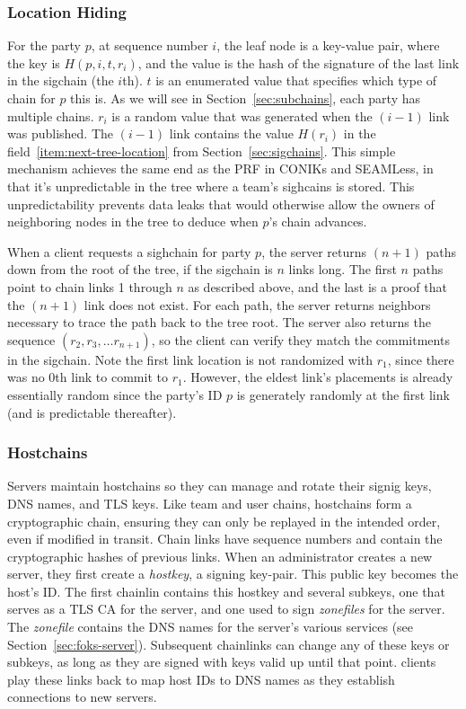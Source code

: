 \subsubsection{Location Hiding}
\label{sec:location-hiding}

For the party $p$, at sequence number $i$, the leaf node is a key-value pair,
where the key is $H(p,i,t,r_i)$, and the value is the hash of the signature of
the last link in the sigchain (the $i$th). $t$ is an enumerated value that
specifies which type of chain for $p$ this is. As we will see in 
Section~\ref{sec:subchains}, each party has multiple chains.  $r_i$ is a random
value that was generated when the $(i-1)$ link was published. The $(i-1)$ link
contains the value $H(r_i)$ in the field~\ref{item:next-tree-location} from
Section~\ref{sec:sigchains}. This simple mechanism achieves the same end as the
PRF in CONIKs and SEAMLess, in that it's unpredictable in the tree where a
team's sighcains is stored. This unpredictability prevents data leaks that would
otherwise allow the owners of neighboring nodes in the tree to deduce when $p$'s
chain advances. 

When a client requests a sighchain for party $p$, the server returns $(n+1)$
paths down from the root of the tree, if the sigchain is $n$ links long. The
first $n$ paths point to chain links 1 through $n$ as described above, and the
last is a proof that the $(n+1)$ link does not exist. For each path, the server
returns neighbors necessary to trace the path back to the tree root. The server
also returns the sequence $(r_2, r_3, \dots r_{n+1})$, so the client can verify
they match the commitments in the sigchain.  Note the first link location is not
randomized with $r_1$, since there was no $0$th link to commit to $r_1$.
However, the eldest link's placements is already essentially random since the
party's ID $p$ is generately randomly at the first link (and is predictable
thereafter).


\subsubsection{Hostchains}
\label{sec:hostchains}

Servers maintain hostchains so they can manage and rotate their signig keys, DNS names,
and TLS keys. Like team and user chains, hostchains form a cryptographic chain, ensuring
they can only be replayed in the intended order, even if modified in transit. Chain links
have sequence numbers and contain the cryptographic hashes of previous links. When an
administrator creates a new server, they first create a \textit{hostkey}, a signing key-pair.
This public key becomes the host's ID. The first chainlin contains this hostkey and several
subkeys, one that serves as a TLS CA for the server, and one used to sign \textit{zonefiles}
for the server. The \textit{zonefile} contains the DNS names for the server's various services
(see Section~\ref{sec:foks-server}). Subsequent chainlinks can change any of these keys
or subkeys, as long as they are signed with keys valid up until that point. clients
play these links back to map host IDs to DNS names as they establish connections
to new servers. 


